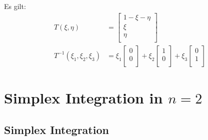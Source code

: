 \documentclass{mitschrift}
\begin{document}
Es gilt: \begin{align}
    T(\xi, \eta) &= \begin{bmatrix}
        1 - \xi - \eta \\
        \xi \\
        \eta \\
    \end{bmatrix} \\
    T^{-1}(\xi_1,\xi_2,\xi_3) &= \xi_1 \begin{bmatrix}
        0\\
        0\\
    \end{bmatrix} + \xi_2 \begin{bmatrix}
        1\\
        0\\
    \end{bmatrix} + \xi_3 \begin{bmatrix}
        0\\
        1\\
    \end{bmatrix}
\end{align}

\section{Simplex Integration in $n=2$}

\subsection{Simplex Integration}
\end{document}
